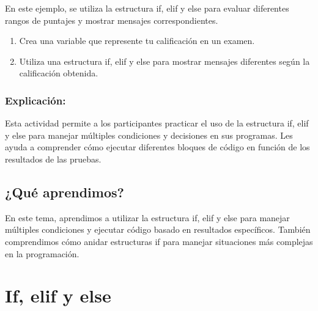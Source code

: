 \documentclass[
  a4paper,
  DIV=11,
  numbers=noendperiod,
  onepage,
  openany]{scrreprt}
\providecommand{\tightlist}{%
  \setlength{\itemsep}{0pt}\setlength{\parskip}{0pt}}\usepackage{longtable,booktabs,array}
\begin{document}
En este ejemplo, se utiliza la estructura if, elif y else para evaluar
diferentes rangos de puntajes y mostrar mensajes correspondientes.

\begin{tcolorbox}[enhanced jigsaw, toptitle=1mm, toprule=.15mm, title=\textcolor{quarto-callout-tip-color}{\faLightbulb}\hspace{0.5em}{Actividad Práctica}, colbacktitle=quarto-callout-tip-color!10!white, opacitybacktitle=0.6, titlerule=0mm, colback=white, left=2mm, bottomrule=.15mm, breakable, bottomtitle=1mm, rightrule=.15mm, colframe=quarto-callout-tip-color-frame, arc=.35mm, leftrule=.75mm, coltitle=black, opacityback=0]

\begin{enumerate}
\def\labelenumi{\arabic{enumi}.}
\tightlist
\item
  Crea una variable que represente tu calificación en un examen.
\item
  Utiliza una estructura if, elif y else para mostrar mensajes
  diferentes según la calificación obtenida.
\end{enumerate}

\end{tcolorbox}

\subsection{Explicación:}\label{explicaciuxf3n-19}

Esta actividad permite a los participantes practicar el uso de la
estructura if, elif y else para manejar múltiples condiciones y
decisiones en sus programas. Les ayuda a comprender cómo ejecutar
diferentes bloques de código en función de los resultados de las
pruebas.

\section{¿Qué aprendimos?}\label{quuxe9-aprendimos-4}

En este tema, aprendimos a utilizar la estructura if, elif y else para
manejar múltiples condiciones y ejecutar código basado en resultados
específicos. También comprendimos cómo anidar estructuras if para
manejar situaciones más complejas en la programación.

\chapter{If, elif y else}\label{if-elif-y-else}
\end{document}
